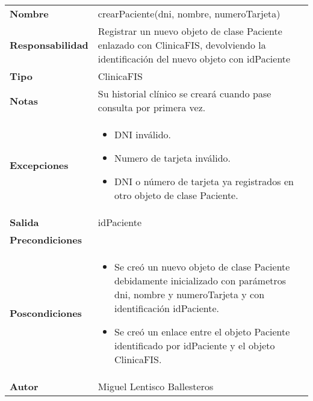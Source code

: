 \documentclass[11pt,a4paper]{article}
\newenvironment{itemizenomargins}
    {\begin{minipage}[t]{1\linewidth}\begin{itemize}}
    {\end{itemize}\end{minipage}}
\begin{document}
\begin{table}[H]
	\centering
	\label{my-label}
	\begin{tabularx}{\textwidth}{l|X}
		\textbf{Nombre}          & crearPaciente(dni, nombre, numeroTarjeta)\\
		\textbf{Responsabilidad} &  Registrar un nuevo objeto de clase Paciente enlazado con ClinicaFIS, devolviendo la identificación del nuevo objeto con idPaciente\\
		\textbf{Tipo}            & ClinicaFIS \\
		\textbf{Notas}           &  Su historial clínico se creará cuando pase consulta por primera vez. \\
		\textbf{Excepciones}     &  
			\begin{itemizenomargins}
				\item DNI inválido.
				\item Numero de tarjeta inválido.
				\item DNI o número de tarjeta ya registrados en otro objeto de clase Paciente.
			\end{itemizenomargins}		\\
		\textbf{Salida}          &  idPaciente \\
		\textbf{Precondiciones}  &  \\
		\textbf{Poscondiciones}  & 
			\begin{itemizenomargins}
				\item Se creó un nuevo objeto de clase Paciente debidamente inicializado con parámetros dni, nombre y numeroTarjeta y con identificación idPaciente.
				\item Se creó un enlace entre el objeto Paciente identificado por idPaciente y el objeto ClinicaFIS.
			\end{itemizenomargins} \\
		\textbf{Autor}			 & Miguel Lentisco Ballesteros
	\end{tabularx}
\end{table}
\end{document}
